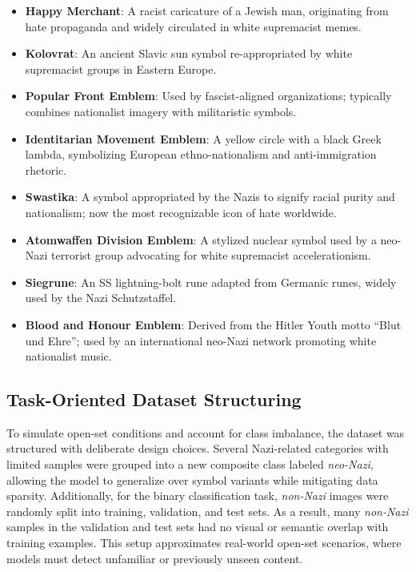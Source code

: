 \begin{itemize}
  \item \textbf{Happy Merchant}: A racist caricature of a Jewish man, originating from hate propaganda and widely
  circulated in white supremacist memes.
  \item \textbf{Kolovrat}: An ancient Slavic sun symbol re-appropriated by white supremacist groups in Eastern Europe.
  \item \textbf{Popular Front Emblem}: Used by fascist-aligned organizations; typically combines nationalist imagery
  with militaristic symbols.
  \item \textbf{Identitarian Movement Emblem}: A yellow circle with a black Greek lambda, symbolizing European
  ethno-nationalism and anti-immigration rhetoric.
  \item \textbf{Swastika}: A symbol appropriated by the Nazis to signify racial purity and nationalism; now the most
  recognizable icon of hate worldwide.
  \item \textbf{Atomwaffen Division Emblem}: A stylized nuclear symbol used by a neo-Nazi terrorist group advocating
  for white supremacist accelerationism.
  \item \textbf{Siegrune}: An \ac{SS} lightning-bolt rune adapted from Germanic runes, widely used by the Nazi
  Schutzstaffel.
  \item \textbf{Blood and Honour Emblem}: Derived from the Hitler Youth motto “Blut und Ehre”; used by an
  international neo-Nazi network promoting white nationalist music.
\end{itemize}

\subsection{Task-Oriented Dataset Structuring}

To simulate open-set conditions and account for class imbalance, the dataset was structured with deliberate design
choices. Several Nazi-related categories with limited samples were grouped into a new composite class labeled
\textit{neo-Nazi}, allowing the model to generalize over symbol variants while mitigating data sparsity.
Additionally, for the binary classification task, \textit{non-Nazi} images were randomly split into training,
validation, and test sets. As a result, many \textit{non-Nazi} samples in the validation and test sets had no visual or
semantic overlap with training examples. This setup approximates real-world open-set scenarios, where models must
detect unfamiliar or previously unseen content.


